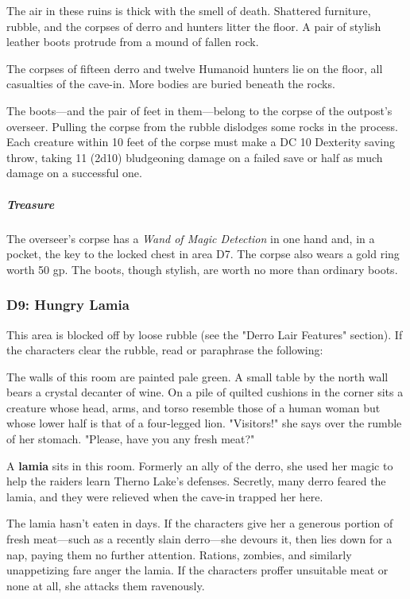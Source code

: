\documentclass[10pt,a4paper,twoside,bg=print,twocolumn,openany,nodeprecatedcode]{dndbook}
\begin{document}
\begin{DndReadAloud}{}
The air in these ruins is thick with the smell of death. Shattered furniture, rubble, and the corpses of derro and hunters litter the floor. A pair of stylish leather boots protrude from a mound of fallen rock.

\end{DndReadAloud}

The corpses of fifteen derro and twelve Humanoid hunters lie on the floor, all casualties of the cave-in. More bodies are buried beneath the rocks.

The boots—and the pair of feet in them—belong to the corpse of the outpost's overseer. Pulling the corpse from the rubble dislodges some rocks in the process. Each creature within 10 feet of the corpse must make a DC 10 Dexterity saving throw, taking 11 (2d10) bludgeoning damage on a failed save or half as much damage on a successful one.

\subparagraph{Treasure}
The overseer's corpse has a \textit{Wand of Magic Detection} in one hand and, in a pocket, the key to the locked chest in area D7. The corpse also wears a gold ring worth 50 gp. The boots, though stylish, are worth no more than ordinary boots.

\subsubsection{D9: Hungry Lamia}
This area is blocked off by loose rubble (see the "Derro Lair Features" section). If the characters clear the rubble, read or paraphrase the following:

\begin{DndReadAloud}{}
The walls of this room are painted pale green. A small table by the north wall bears a crystal decanter of wine. On a pile of quilted cushions in the corner sits a creature whose head, arms, and torso resemble those of a human woman but whose lower half is that of a four-legged lion. "Visitors!" she says over the rumble of her stomach. "Please, have you any fresh meat?"

\end{DndReadAloud}

A \textbf{lamia} sits in this room. Formerly an ally of the derro, she used her magic to help the raiders learn Therno Lake's defenses. Secretly, many derro feared the lamia, and they were relieved when the cave-in trapped her here.

The lamia hasn't eaten in days. If the characters give her a generous portion of fresh meat—such as a recently slain derro—she devours it, then lies down for a nap, paying them no further attention. Rations, zombies, and similarly unappetizing fare anger the lamia. If the characters proffer unsuitable meat or none at all, she attacks them ravenously.
\end{document}
